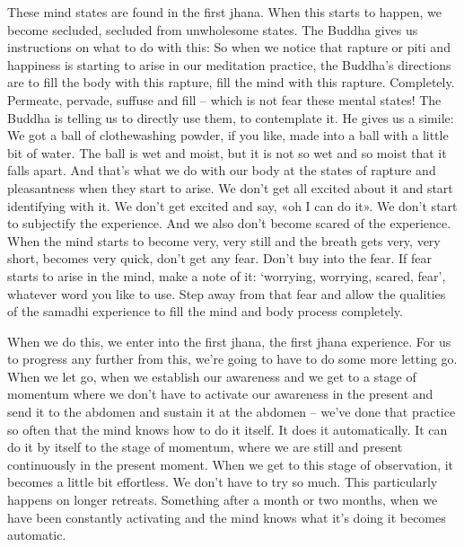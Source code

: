 \documentclass[letterpaper,10pt,english]{sphinxmanual}
\begin{document}
\sphinxAtStartPar
These mind states are found in the first jhana. When this starts to happen,
we become secluded, secluded from unwholesome states. The Buddha gives
us instructions on what to do with this:
So when we notice that rapture or piti and happiness is
starting  to  arise  in  our  meditation  practice,  the  Buddha’s  directions  are  to
fill  the  body  with  this  rapture,  fill  the  mind  with  this  rapture.  Completely.
Permeate, pervade, suffuse and fill – which is not fear these mental states!
  The Buddha is telling us to directly use them, to contemplate it. He gives
us a simile:
We got a
ball of clothe\sphinxhyphen{}washing powder, if you like, made into a ball with a little bit
of water. The ball is wet and moist, but it is not so wet and so moist that it
falls apart. And that’s what we do with our body at the states of rapture and
pleasantness when they start to arise. We don’t get all excited about it and
start identifying with it. We don’t get excited and say, «oh I can do it». We
don’t  start  to  subjectify  the  experience. And  we  also  don’t  become  scared
of the experience. When the mind starts to become very, very still and the
breath gets very, very short, becomes very quick, don’t get any fear. Don’t
buy into the fear. If fear starts to arise in the mind, make a note of it: ‘worrying, worrying, scared, fear’, whatever word you like to use. Step away from
that fear and allow the qualities of the samadhi experience to fill the mind
and body process completely.

\sphinxAtStartPar
When we do this, we enter into the first jhana, the first jhana experience.  For  us  to  progress  any  further  from  this,  we’re  going  to  have  to  do
some more letting go. When we let go, when we establish our awareness and
we get to a stage of momentum where we don’t have to activate our awareness in the present and send it to the abdomen and sustain it at the abdomen
– we’ve done that practice so often that the mind knows how to do it itself. It
does it automatically. It can do it by itself to the stage of momentum, where
we are still and present continuously in the present moment. When we get
to this stage of observation, it becomes a little bit effortless. We don’t have
to try so much. This particularly happens on longer retreats. Something after
a month or two months, when we have been constantly activating and the
mind knows what it’s doing it becomes automatic.
\end{document}
